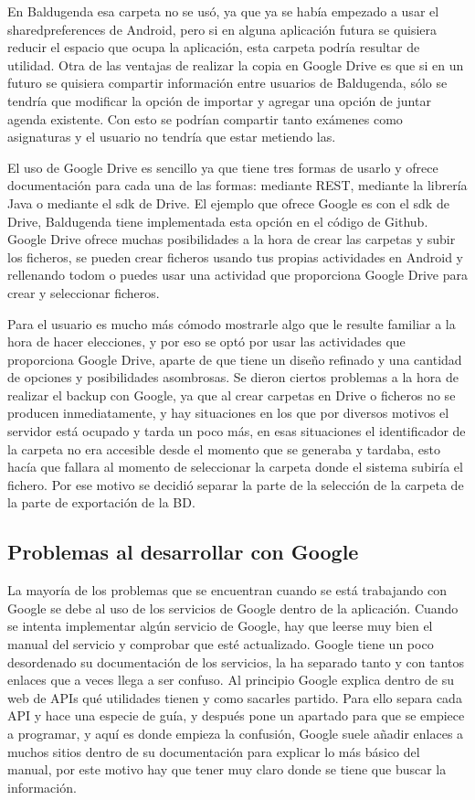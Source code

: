 En Baldugenda esa carpeta no se usó, ya que ya se había empezado a usar el sharedpreferences de Android, pero si en alguna aplicación futura se quisiera reducir el espacio que ocupa la aplicación, esta carpeta podría resultar de utilidad.
Otra de las ventajas de realizar la copia en Google Drive es que si en un futuro se quisiera compartir información entre usuarios de Baldugenda, sólo se tendría que modificar la opción de importar y agregar una opción de juntar agenda existente. Con esto se podrían compartir tanto exámenes como asignaturas y el usuario no tendría que estar metiendo las.

El uso de Google Drive es sencillo ya que tiene tres formas de usarlo y ofrece documentación para cada una de las formas: mediante REST, mediante la librería Java o mediante el sdk de Drive.
El ejemplo que ofrece Google es con el sdk de Drive, Baldugenda tiene implementada esta opción en el código de Github.
Google Drive ofrece muchas posibilidades a la hora de crear las carpetas y subir los ficheros, se pueden crear ficheros usando tus propias actividades en Android y rellenando todom o puedes usar una actividad que proporciona Google Drive para crear y seleccionar ficheros.

Para el usuario es mucho más cómodo mostrarle algo que le resulte familiar a la hora de hacer elecciones, y por eso se optó por usar las actividades que proporciona Google Drive, aparte de que tiene un diseño refinado y una cantidad de opciones y posibilidades asombrosas.
Se dieron ciertos problemas a la hora de realizar el backup con Google, ya que al crear carpetas en Drive o ficheros no se producen inmediatamente, y hay situaciones en los que por diversos motivos el servidor está ocupado y tarda un poco más, en esas situaciones el identificador de la carpeta no era accesible desde el momento que se generaba y tardaba, esto hacía que fallara al momento de seleccionar la carpeta donde el sistema subiría el fichero.
Por ese motivo se decidió separar la parte de la selección de la carpeta de la parte de exportación de la BD.

\subsection{Problemas al desarrollar con Google}
\label{subsecc:Problemas al desarrollar con Google}

La mayoría de los problemas que se encuentran cuando se está trabajando con Google se debe al uso de los servicios de Google dentro de la aplicación.
Cuando se intenta implementar algún servicio de Google, hay que leerse muy bien el manual del servicio y comprobar que esté actualizado. Google tiene un poco desordenado su documentación de los servicios, la ha separado tanto y con tantos enlaces que a veces llega a ser confuso.
Al principio Google explica dentro de su web de APIs qué utilidades tienen y como sacarles partido. Para ello separa cada API y hace una especie de guía, y después pone un apartado para que se empiece a programar, y aquí es donde empieza la confusión, Google suele añadir enlaces a muchos sitios dentro de su documentación para explicar lo más básico del manual, por este motivo hay que tener muy claro donde se tiene que buscar la información.

